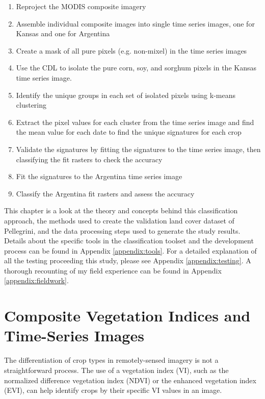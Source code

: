 \begin{Spacing}{1.5}
\begin{enumerate}
  \item Reproject the MODIS composite imagery
  \item Assemble individual composite images into single time series images, one for Kansas and one for Argentina
  \item Create a mask of all pure pixels (e.g. non-mixel) in the time series images
  \item Use the CDL to isolate the pure corn, soy, and sorghum pixels in the Kansas time series image.
  \item Identify the unique groups in each set of isolated pixels using k-means clustering
  \item Extract the pixel values for each cluster from the time series image and find the mean value for each date to find the unique signatures for each crop
  \item Validate the signatures by fitting the signatures to the time series image, then classifying the fit rasters to check the accuracy
  \item Fit the signatures to the Argentina time series image
  \item Classify the Argentina fit rasters and assess the accuracy
\end{enumerate}
\end{Spacing}

This chapter is a look at the theory and concepts behind this classification approach, the methods used to create the validation land cover dataset of Pellegrini, and the data processing steps used to generate the study results. Details about the specific tools in the classification toolset and the development process can be found in Appendix \ref{appendix:tools}. For a detailed explanation of all the testing proceeding this study, please see Appendix \ref{appendix:testing}. A thorough recounting of my field experience can be found in Appendix \ref{appendix:fieldwork}.

\section{Composite Vegetation Indices and Time-Series Images}

The differentiation of crop types in remotely-sensed imagery is not a straightforward process. The use of a vegetation index (VI), such as the normalized difference vegetation index (NDVI) or the enhanced vegetation index (EVI), can help identify crops by their specific VI values in an image.

